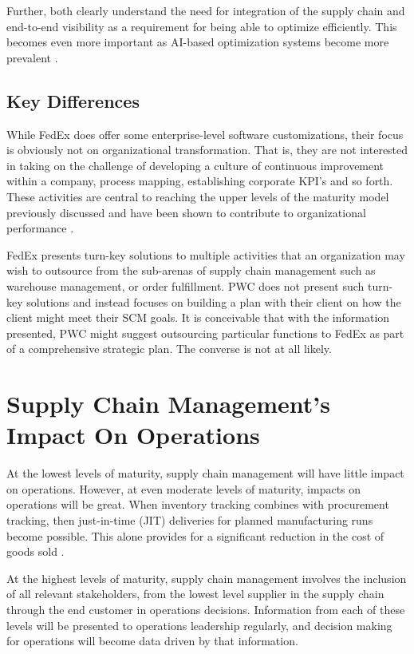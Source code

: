 \documentclass[man]{apa7}
\begin{document}
Further, both clearly understand the need for integration of the supply chain and end-to-end visibility as a requirement for being able to optimize efficiently. This becomes even more important as AI-based optimization systems become more prevalent \parencite{praveenInventoryManagementCost2019}.



\subsection{Key Differences}
\label{sec:org8aafe52}

While FedEx does offer some enterprise-level software customizations, their focus is obviously not on organizational transformation. That is, they are not interested in taking on the challenge of developing a culture of continuous improvement within a company, process mapping, establishing corporate KPI's and so forth. These activities are central to reaching the upper levels of the maturity model previously discussed and have been shown to contribute to organizational performance \parencite{keawkuntiRelationshipSupplyChain2020}.

FedEx presents turn-key solutions to multiple activities that an organization may wish to outsource from the sub-arenas of supply chain management such as warehouse management, or order fulfillment. PWC does not present such turn-key solutions and instead focuses on building a plan with their client on how the client might meet their SCM goals. It is conceivable that with the information presented, PWC might suggest outsourcing particular functions to FedEx as part of a comprehensive strategic plan. The converse is not at all likely.


\section{Supply Chain Management's Impact On Operations}
\label{sec:org377c512}

At the lowest levels of maturity, supply chain management will have little impact on operations. However, at even moderate levels of maturity, impacts on operations will be great. When inventory tracking combines with procurement tracking, then just-in-time (JIT) deliveries for planned manufacturing runs become possible. This alone provides for a significant reduction in the cost of goods sold \parencite{cortes-comererJITMadeOrder1986}.

At the highest levels of maturity, supply chain management involves the inclusion of all relevant stakeholders, from the lowest level supplier in the supply chain through the end customer in operations decisions. Information from each of these levels will be presented to operations leadership regularly, and decision making for operations will become data driven by that information.
\end{document}
